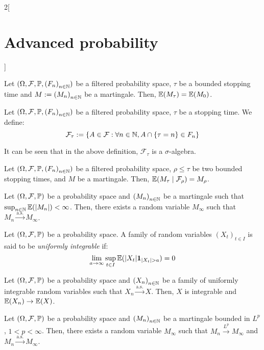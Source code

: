 \documentclass[../../../main_math.tex]{subfiles}
\begin{document}
\begin{multicols}{2}[\section{Advanced probability}]
\begin{proposition}
  \end{proposition}
  \begin{corollary}
    Let $(\Omega,\mathcal{F},\mathbb{P},{(F_n)}_{n\in\mathbb{N}})$ be a filtered probability space, $\tau$ be a bounded stopping time and $M:={(M_n)}_{n\in\mathbb{N}}$ be a martingale. Then, $\mathbb{E}(M_\tau)=\mathbb{E}(M_0)$.
  \end{corollary}
  \begin{definition}
    Let $(\Omega,\mathcal{F},\mathbb{P},{(F_n)}_{n\in\mathbb{N}})$ be a filtered probability space, $\tau$ be a stopping time. We define:
    $$
      \mathcal{F}_\tau:=\{A\in\mathcal{F}:\forall n\in\mathbb{N}, A\cap \{\tau=n\}\in F_n\}
    $$
  \end{definition}
  \begin{remark}
    It can be seen that in the above definition, $\mathcal{F}_\tau$ is a $\sigma$-algebra.
  \end{remark}
  \begin{proposition}
    Let $(\Omega,\mathcal{F},\mathbb{P},{(F_n)}_{n\in\mathbb{N}})$ be a filtered probability space, $\rho\leq\tau$ be two bounded stopping times, and $M$ be a martingale. Then, $\mathbb{E}(M_\tau\mid \mathcal{F}_\rho)=M_\rho$.
  \end{proposition}
  \begin{theorem}
    Let $(\Omega,\mathcal{F},\mathbb{P})$ be a probability space and ${(M_n)}_{n\in\mathbb{N}}$ be a martingale such that $\sup_{n\in\mathbb{N}}{\mathbb{E}(\abs{M_n})}<\infty$. Then, there exists a random variable $M_\infty$ such that $M_n\overset{\text{a.s.}}{\to} M_\infty$.
  \end{theorem}
  \begin{definition}
    Let $(\Omega,\mathcal{F},\mathbb{P})$ be a probability space. A family of random variables ${(X_t)}_{t\in I}$ is said to be \emph{uniformly integrable} if:
    $$
      \lim_{a\to\infty}{\sup_{t\in I}{\mathbb{E}(\abs{X_t}\boldsymbol{\mathrm{1}}_{\abs{X_t}>a})}}=0
    $$
  \end{definition}
  \begin{proposition}
    Let $(\Omega,\mathcal{F},\mathbb{P})$ be a probability space and ${(X_n)}_{n\in\mathbb{N}}$ be a family of uniformly integrable random variables such that $X_n\overset{\text{a.s.}}{\to} X$. Then, $X$ is integrable and $\mathbb{E}(X_n)\to \mathbb{E}(X)$.
  \end{proposition}
  \begin{theorem}
    Let $(\Omega,\mathcal{F},\mathbb{P})$ be a probability space and ${(M_n)}_{n\in\mathbb{N}}$ be a martingale bounded in $L^p$, $1<p<\infty$. Then, there exists a random variable $M_\infty$ such that $M_n\overset{L^p}{\to} M_\infty$ and $M_n\overset{\text{a.s.}}{\to} M_\infty$.
  \end{theorem}
\end{multicols}
\end{document}
